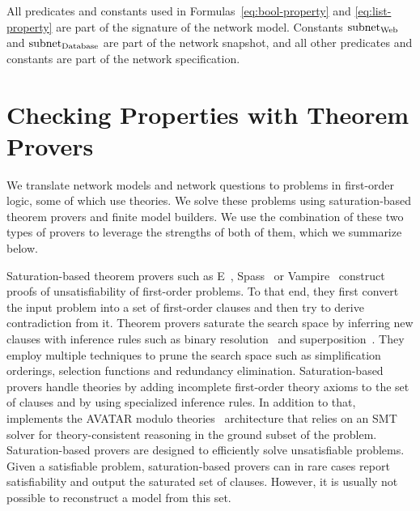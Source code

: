 All predicates and constants used in Formulas~\ref{eq:bool-property} and \ref{eq:list-property} are part of the signature of the network model. Constants $\mathrm{subnet}_\text{Web}$ and $\mathrm{subnet}_\text{Database}$ are part of the network snapshot, and all other predicates and constants are part of the network specification.

% 

\section{Checking Properties with Theorem Provers}
\label{sect:aws/fol-provers}

We translate network models and network questions to problems in first-order logic, some of which use theories. We solve these problems using saturation-based theorem provers and finite model builders. We use the combination of these two types of provers to leverage the strengths of both of them, which we summarize below.

Saturation-based theorem provers such as E~\cite{E13}, Spass~\cite{Spass} or Vampire~\cite{Vampire13} construct proofs of unsatisfiability of first-order problems. To that end, they first convert the input problem into a set of first-order clauses and then try to derive contradiction from it. Theorem provers saturate the search space by inferring new clauses with inference rules such as binary resolution~\cite{Ganzinger01} and superposition~\cite{NieuwenhuisRubio:HandbookAR:paramodulation:2001}. They employ multiple techniques to prune the search space such as simplification orderings, selection functions and redundancy elimination. Saturation-based provers handle theories by adding incomplete first-order theory axioms to the set of clauses and by using specialized inference rules. In addition to that, \vampire implements the AVATAR modulo theories~\cite{DBLP:conf/gcai/RegerB0V16} architecture that relies on an SMT solver for theory-consistent reasoning in the ground subset of the problem. Saturation-based provers are designed to efficiently solve unsatisfiable problems. Given a satisfiable problem, saturation-based provers can in rare cases report satisfiability and output the saturated set of clauses. However, it is usually not possible to reconstruct a model from this set.


